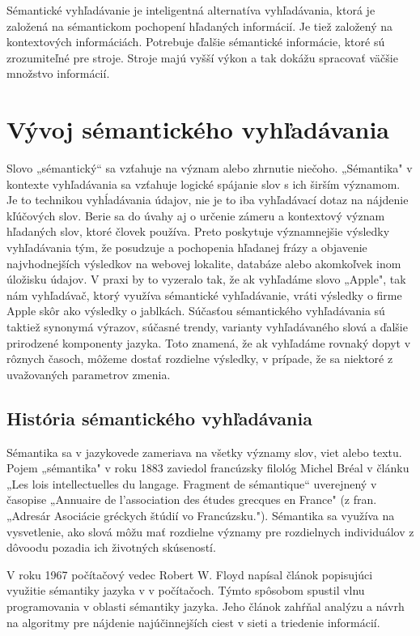\documentclass[10pt,twoside,slovak,a4paper]{article}
\begin{document}
Sémantické vyhľadávanie je inteligentná alternatíva vyhľadávania, ktorá je založená na sémantickom pochopení hľadaných informácií. Je tiež založený na kontextových informáciách. Potrebuje ďalšie sémantické informácie, ktoré sú zrozumiteľné pre stroje. Stroje majú vyšší výkon a tak dokážu spracovať väčšie množstvo informácií.

\section{Vývoj sémantického vyhľadávania} \label{vyvoj} \cite{roy2019overview}
Slovo „sémantický“ sa vzťahuje na význam alebo zhrnutie niečoho. „Sémantika" v kontexte vyhľadávania sa vzťahuje logické spájanie slov s ich širším významom. Je to technikou vyhĺadávania údajov, nie je to iba vyhľadávací dotaz na nájdenie kľúčových slov. Berie sa do úvahy aj o určenie zámeru a kontextový význam hľadaných slov, ktoré človek používa. Preto poskytuje významnejšie výsledky vyhľadávania tým, že posudzuje a pochopenia hľadanej frázy a objavenie najvhodnejších výsledkov na webovej lokalite, databáze alebo akomkoľvek inom úložisku údajov. V praxi by to vyzeralo tak, že ak vyhľadáme slovo „Apple", tak nám vyhľadávač, ktorý využíva sémantické vyhľadávanie, vráti výsledky o firme Apple skôr ako výsledky o jablkách. Súčasťou sémantického vyhľadávania sú taktiež synonymá výrazov, súčasné trendy, varianty vyhľadávaného slová a ďalšie prirodzené komponenty jazyka. Toto znamená, že ak vyhľadáme rovnaký dopyt v rôznych časoch, môžeme dostať rozdielne výsledky, v prípade, že sa niektoré z uvažovaných parametrov zmenia.

\subsection{História sémantického vyhľadávania} \label{vyvoj:historia}
Sémantika sa v jazykovede zameriava na všetky významy slov, viet alebo textu. Pojem „sémantika" v roku 1883 zaviedol francúzsky filológ Michel Bréal v článku „Les lois intellectuelles du langage. Fragment de sémantique“ uverejnený v časopise „Annuaire de l'association des études grecques en France" (z fran. „Adresár Asociácie gréckych štúdií vo Francúzsku."). Sémantika sa využíva na vysvetlenie, ako slová môžu mať rozdielne významy pre rozdielnych individuálov z dôvoodu pozadia ich životných skúseností. 

V roku 1967 počítačový vedec Robert W. Floyd napísal článok popisujúci využitie sémantiky jazyka v v počítačoch. Týmto spôsobom spustil vlnu programovania v oblasti sémantiky jazyka. Jeho článok zahŕňal analýzu a návrh na algoritmy pre nájdenie najúčinnejších ciest v sieti a triedenie informácií.
\end{document}

